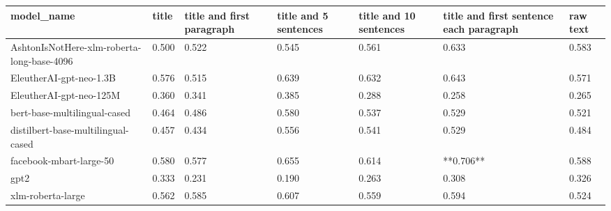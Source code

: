 \begin{tabular}{lllllll}
\toprule
                                model\_name & title & title and first paragraph & title and 5 sentences & title and 10 sentences & title and first sentence each paragraph & raw text \\
\midrule
AshtonIsNotHere-xlm-roberta-long-base-4096 & 0.500 &                     0.522 &                 0.545 &                  0.561 &                                   0.633 &    0.583 \\
                   EleutherAI-gpt-neo-1.3B & 0.576 &                     0.515 &                 0.639 &                  0.632 &                                   0.643 &    0.571 \\
                   EleutherAI-gpt-neo-125M & 0.360 &                     0.341 &                 0.385 &                  0.288 &                                   0.258 &    0.265 \\
              bert-base-multilingual-cased & 0.464 &                     0.486 &                 0.580 &                  0.537 &                                   0.529 &    0.521 \\
        distilbert-base-multilingual-cased & 0.457 &                     0.434 &                 0.556 &                  0.541 &                                   0.529 &    0.484 \\
                   facebook-mbart-large-50 & 0.580 &                     0.577 &                 0.655 &                  0.614 &                               **0.706** &    0.588 \\
                                      gpt2 & 0.333 &                     0.231 &                 0.190 &                  0.263 &                                   0.308 &    0.326 \\
                         xlm-roberta-large & 0.562 &                     0.585 &                 0.607 &                  0.559 &                                   0.594 &    0.524 \\
\bottomrule
\end{tabular}
